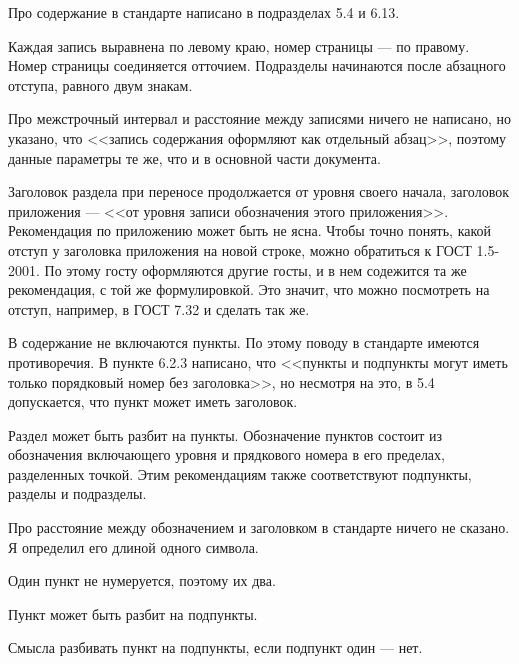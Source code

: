 

Про содержание в стандарте написано в подразделах 5.4 и 6.13.

Каждая запись выравнена по левому краю, номер страницы --- по правому. Номер
страницы соединяется отточием. Подразделы начинаются после абзацного отступа,
равного двум знакам.

Про межстрочный интервал и расстояние между записями ничего не написано, но
указано, что <<запись содержания оформляют как отдельный абзац>>, поэтому
данные параметры те же, что и в основной части документа.

Заголовок раздела при переносе продолжается от уровня своего начала, заголовок
приложения --- <<от уровня записи обозначения этого приложения>>. Рекомендация
по приложению может быть не ясна. Чтобы точно понять, какой отступ у заголовка
приложения на новой строке, можно обратиться к ГОСТ 1.5-2001. По этому госту
оформляются другие госты, и в нем содежится та же рекомендация, с той же
формулировкой. Это значит, что можно посмотреть на отступ, например, в ГОСТ
7.32 и сделать так же.


В содержание не включаются пункты. По этому поводу в стандарте имеются
противоречия. В пункте 6.2.3 написано, что <<пункты и подпункты могут иметь
только порядковый номер без заголовка>>, но несмотря на это, в 5.4 допускается,
что пункт может иметь заголовок.


\parag

Раздел может быть разбит на пункты. Обозначение пунктов состоит из обозначения
включающего уровня и прядкового номера в его пределах, разделенных точкой. Этим
рекомендациям также соответствуют подпункты, разделы и подразделы.

Про расстояние между обозначением и заголовком в стандарте ничего не
сказано. Я определил его длиной одного символа.

\parag

Один пункт не нумеруется, поэтому их два.

\subparag

Пункт может быть разбит на подпункты.

\subparag

Смысла разбивать пункт на подпункты, если подпункт один --- нет.


